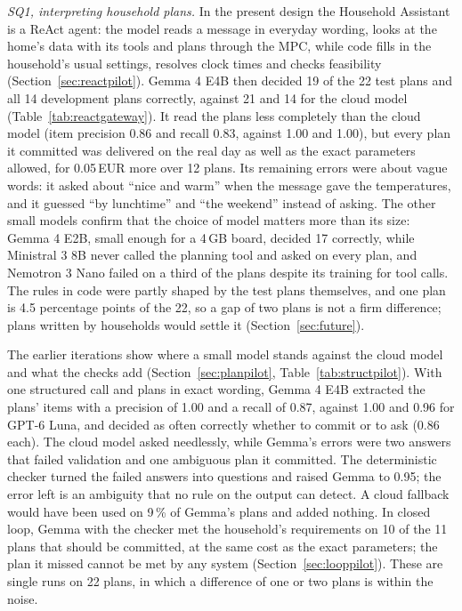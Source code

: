 \documentclass[12pt,a4paper]{report}
\begin{document}
\textit{SQ1, interpreting household plans.} In the present design the
Household Assistant is a ReAct agent: the model reads a message in
everyday wording, looks at the home's data with its tools and plans
through the MPC, while code fills in the household's usual settings,
resolves clock times and checks feasibility
(Section~\ref{sec:reactpilot}). Gemma 4 E4B then decided 19 of the 22
test plans and all 14 development plans correctly, against 21 and 14
for the cloud model (Table~\ref{tab:reactgateway}). It read the plans
less completely than the cloud model (item precision 0.86 and recall
0.83, against 1.00 and 1.00), but every plan it committed was delivered
on the real day as well as the exact parameters allowed, for 0.05\,EUR
more over 12 plans. Its remaining errors were about vague
words: it asked about ``nice and warm'' when the message gave the
temperatures, and it guessed ``by lunchtime'' and ``the weekend''
instead of asking. The other small models confirm that the choice of
model matters more than its size: Gemma 4 E2B, small enough for a 4\,GB
board, decided 17 correctly, while Ministral 3 8B never called the
planning tool and asked on every plan, and Nemotron 3 Nano failed on a
third of the plans despite its training for tool calls. The rules in
code were partly shaped by the test plans themselves, and one plan is
4.5 percentage points of the 22, so a gap of two plans is not a firm
difference; plans written by households would settle it
(Section~\ref{sec:future}).

The earlier iterations show where a small model stands against the
cloud model and what the checks add (Section~\ref{sec:planpilot},
Table~\ref{tab:structpilot}). With one structured call and plans in
exact wording, Gemma 4 E4B extracted the plans' items with a precision
of 1.00 and a recall of 0.87, against 1.00 and 0.96 for GPT-6 Luna, and
decided as often correctly whether to commit or to ask (0.86 each). The
cloud model asked needlessly, while Gemma's errors were two answers that
failed validation and one ambiguous plan it committed. The
deterministic checker turned the failed answers into questions and
raised Gemma to 0.95; the error left is an ambiguity that no rule on the
output can detect. A cloud fallback would have been used on 9\,\% of
Gemma's plans and added nothing. In closed loop, Gemma with the checker
met the household's requirements on 10 of the 11 plans that should be
committed, at the same cost as the exact parameters; the plan it missed
cannot be met by any system (Section~\ref{sec:looppilot}). These are single runs on 22 plans, in
which a difference of one or two plans is within the noise.
\end{document}
